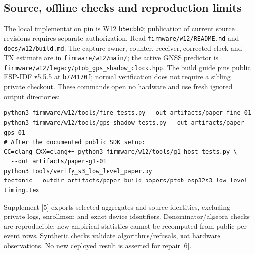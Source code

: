 \documentclass[10pt,letterpaper]{article}
\newcommand{\src}[1]{\nolinkurl{#1}}
\newcommand{\codepin}{\texttt{b5ecbb0}}
\begin{document}
\subsection{Source, offline checks and reproduction limits}
The local implementation pin is W12 \codepin; publication of current source revisions requires separate authorization. Read \src{firmware/w12/README.md} and \src{docs/w12/build.md}. The capture owner, counter, receiver, corrected clock and TX estimate are in \src{firmware/w12/main/}; the active GNSS predictor is \src{firmware/w12/legacy/ptob_gps_shadow_clock.hpp}. The build guide pins public ESP-IDF v5.5.5 at \src{b774170f}; normal verification does not require a sibling private checkout. These commands open no hardware and use fresh ignored output directories:
\begin{lstlisting}[basicstyle=\ttfamily\footnotesize]
python3 firmware/w12/tools/fine_tests.py --out artifacts/paper-fine-01
python3 firmware/w12/tools/gps_shadow_tests.py --out artifacts/paper-gps-01
# After the documented public SDK setup:
CC=clang CXX=clang++ python3 firmware/w12/tools/g1_host_tests.py \
  --out artifacts/paper-g1-01
python3 tools/verify_s3_low_level_paper.py
tectonic --outdir artifacts/paper-build papers/ptob-esp32s3-low-level-timing.tex
\end{lstlisting}
Supplement [5] exports selected aggregates and source identities, excluding private logs, enrollment and exact device identifiers. Denominator/algebra checks are reproducible; new empirical statistics cannot be recomputed from public per-event rows. Synthetic checks validate algorithms/refusals, not hardware observations. No new deployed result is asserted for repair [6].
\end{document}
